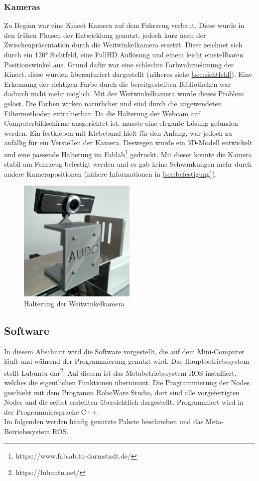 \subsubsection{Kameras}
\label{sec:kameras}
Zu Beginn war eine Kinect Kamera auf dem Fahrzeug verbaut. Diese wurde in den frühen Phasen der Entwicklung genutzt, jedoch kurz nach der Zwischenpräsentation durch die Weitwinkelkamera ersetzt. Diese zeichnet sich durch ein 120° Sichtfeld, eine FullHD Auflösung und einem leicht einstellbaren Positionswinkel aus.
Grund dafür war eine schlechte Farbwahrnehmung der Kinect, diese wurden übersaturiert dargestellt (näheres siehe \autoref{sec:sichtfeld}). Eine Erkennung der richtigen Farbe durch die bereitgestellten Bibliotheken war dadurch nicht mehr möglich. 
Mit der Weitwinkelkamera wurde dieses Problem gelöst. Die Farben wirken natürlicher und sind durch die angewendeten Filtermethoden extrahierbar. Da die Halterung der Webcam auf Computerbildschirme ausgerichtet ist, musste eine elegante Lösung gefunden werden. Ein festkleben mit Klebeband hielt für den Anfang, war jedoch zu anfällig für ein Verstellen der Kamera.
Deswegen  wurde ein 3D-Modell entwickelt und eine passende Halterung im Fablab\footnote{https://www.fablab.tu-darmstadt.de/} gedruckt. Mit dieser konnte die Kamera stabil am Fahrzeug befestigt werden und es gab keine Schwankungen mehr durch andere Kamerapositionen (nähere Informationen in \autoref{sec:befestigung}). 
\begin{figure}
	\centering
	\includegraphics[width=0.5\textwidth]{images/Foto_Halterung.jpg}
	\caption{Halterung der Weitwinkelkamera}
	\label{abb:halterung}
\end{figure}
\subsection{Software}
\label{sec:software}
In diesem Abschnitt wird die Software vorgestellt, die auf dem Mini-Computer läuft und während der Programmierung genutzt wird. Das Hauptbetriebssystem stellt Lubuntu dar\footnote{https://lubuntu.net/}. Auf diesem ist das Metabetriebssystem ROS installiert, welches die eigentlichen Funktionen übernimmt. Die Programmierung der Nodes geschieht mit dem Programm RoboWare Studio, dort sind alle vorgefertigten Nodes und die selbst erstellten  übersichtlich dargestellt. Programmiert wird in der Programmiersprache C++. \\
Im folgenden werden häufig genutzte Pakete beschrieben und das Meta-Betriebssystem ROS.

